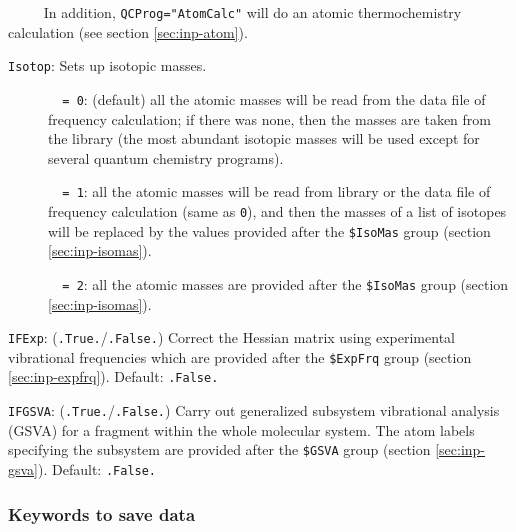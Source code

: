 \documentclass[12pt,english]{extarticle}
\begin{document}
\verb|     |In addition, \verb|QCProg="AtomCalc"| will do an atomic thermochemistry calculation (see section \ref{sec:inp-atom}).

\bigskip{}\bigskip{}
\verb|Isotop|: Sets up isotopic masses.
\begin{description}
\item[ ]\verb|  = 0|: (default) all the atomic masses will be read from the data file of frequency calculation;
if there was none, then the masses are taken from the library (the most abundant isotopic masses will be used except for several quantum chemistry programs).
\item[ ]\verb|  = 1|: all the atomic masses will be read from library or the data file of
frequency calculation (same as \verb|0|), and then the masses of a list of isotopes will be
replaced by the values provided after the \verb|$IsoMas| group (section \ref{sec:inp-isomas}).
\item[ ]\verb|  = 2|: all the atomic masses are provided after the \verb|$IsoMas| group (section \ref{sec:inp-isomas}).
\end{description}

\bigskip{}\bigskip{}
\verb|IFExp|: (\verb|.True.|/\verb|.False.|) Correct the Hessian matrix using
experimental vibrational frequencies which are provided after the \verb|$ExpFrq| group (section \ref{sec:inp-expfrq}).
Default: \verb|.False.|


\bigskip{}\bigskip{}
\verb|IFGSVA|: (\verb|.True.|/\verb|.False.|)   Carry out generalized subsystem vibrational analysis (GSVA) for a fragment within the whole molecular system. The atom labels specifying the subsystem are provided after the  \verb|$GSVA| group (section \ref{sec:inp-gsva}).
Default: \verb|.False.|


\subsubsection{Keywords to save data} \label{subsec:inp-qcdata-save}
\end{document}
